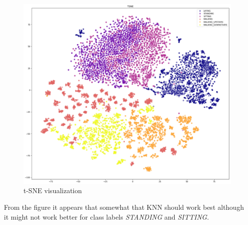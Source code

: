 \documentclass[12pt]{article}
\begin{document}
\begin{figure}[H]
	\centering
	\includegraphics[scale=0.30]{tsne.png}
	\caption{t-SNE visualization}
\end{figure}\noindent
From the figure it appears that somewhat that KNN should work best although it might not work better for class labels \textit{STANDING} and \textit{SITTING}.
\end{document}
